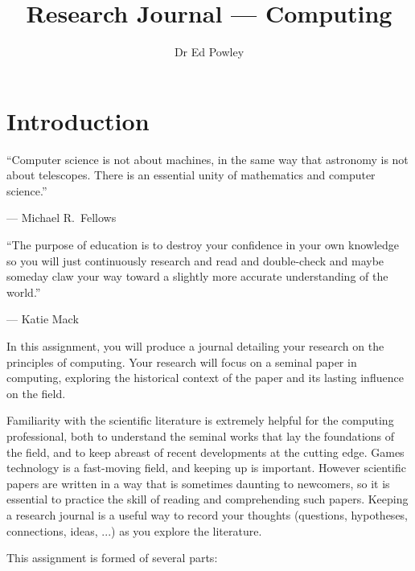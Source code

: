 \documentclass{../../fal_assignment}
\title{Research Journal --- Computing}
\author{Dr Ed Powley}
\begin{document}
\maketitle

\section*{Introduction}

\begin{marginquote}
  ``Computer science is not about machines, in the same way that astronomy is not about telescopes. There is an essential unity of mathematics and computer science.''
    
    --- Michael R.\ Fellows
    
    \marginquoterule
    
    ``The purpose of education is to destroy your confidence in your own knowledge so you will just continuously research and read and double-check and maybe someday claw your way toward a slightly more accurate understanding of the world.''
    
    --- Katie Mack
\end{marginquote}

In this assignment, you will produce a journal detailing your research on the principles of computing.
Your research will focus on a seminal paper in computing,
exploring the historical context of the paper and its lasting influence on the field.

Familiarity with the scientific literature is extremely helpful for the computing professional,
both to understand the seminal works that lay the foundations of the field,
and to keep abreast of recent developments at the cutting edge.
Games technology is a fast-moving field, and keeping up is important.
However scientific papers are written in a way that is sometimes daunting to newcomers,
so it is essential to practice the skill of reading and comprehending such papers.
Keeping a research journal is a useful way to record your thoughts
(questions, hypotheses, connections, ideas, ...) as you explore the literature.

This assignment is formed of several parts:
\end{document}
